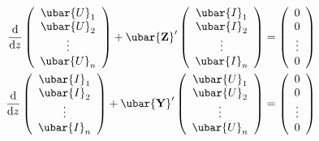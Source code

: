 \begin{equation}\label{verallgmatr}\begin{split}
	\frac{\mathrm{d}}{\mathrm{d} z}\left(\begin{array}{c}
		\ubar{U}_{1}  \\
		\ubar{U}_{2} \\
		\vdots \\
		\ubar{U}_{n}
	\end{array}\right)+\ubar{\mathbf{Z}}^{\prime}\left(\begin{array}{c}
		\ubar{I}_{1} \\
		\ubar{I}_{2} \\
		\vdots \\
		\ubar{I}_{n}
	\end{array}\right)&=\left(\begin{array}{c}
		0 \\
		0 \\
		\vdots \\
		0
	\end{array}\right) \\ \frac{\mathrm{d}}{\mathrm{d} z}\left(\begin{array}{c}
		\ubar{I}_{1} \\
		\ubar{I}_{2} \\
		\vdots \\
		\ubar{I}_{n}
	\end{array}\right)+\ubar{\mathbf{Y}}^{\prime}\left(\begin{array}{c}
		\ubar{U}_{1} \\
		\ubar{U}_{2} \\
		\vdots \\
		\ubar{U}_{n}
	\end{array}\right)&=\left(\begin{array}{c}
		0 \\
		0 \\
		\vdots \\
		0
	\end{array}\right)
\end{split}\end{equation}

